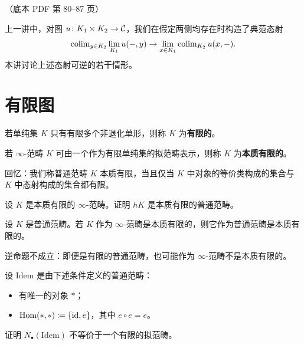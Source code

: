 \begin{center}\small\color{black!55}（底本 PDF 第 80–87 页）\end{center}

上一讲中，对图 $u\colon K_1\times K_2\to\mathcal{C}$，我们在假定两侧均存在时构造了典范态射
\[
\operatorname{colim}_{y\in K_2}\lim_{K_1}u(-,y)\to\lim_{x\in K_1}\operatorname{colim}_{K_2}u(x,-).
\]
本讲讨论上述态射可逆的若干情形。

\section{有限图}

\begin{definition}\label{L10-1.1}
若单纯集 $K$ 只有有限多个非退化单形，则称 $K$ 为\textbf{有限的}。

若 $\infty$-范畴 $K$ 可由一个作为有限单纯集的拟范畴表示，则称 $K$ 为\textbf{本质有限的}。
\end{definition}

\nitem\label{L10-1.2} 回忆：我们称普通范畴 $K$ 本质有限，当且仅当 $K$ 中对象的等价类构成的集合与 $K$ 中态射构成的集合都有限。

\begin{exercise}\label{L10-1.3}
设 $K$ 是本质有限的 $\infty$-范畴。证明 $hK$ 是本质有限的普通范畴。
\end{exercise}

\begin{exercise}\label{L10-1.4}
设 $K$ 是普通范畴。若 $K$ 作为 $\infty$-范畴是本质有限的，则它作为普通范畴是本质有限的。
\end{exercise}

\begin{warning}\label{L10-1.5}
逆命题不成立：即便是有限的普通范畴，也可能作为 $\infty$-范畴不是本质有限的。
\end{warning}

\begin{exercise}\label{L10-1.6}
设 $\mathrm{Idem}$ 是由下述条件定义的普通范畴：
\begin{itemize}[leftmargin=2.2em,itemsep=0.1em]
\item 有唯一的对象 $\ast$；
\item $\operatorname{Hom}(\ast,\ast)\coloneqq\{\operatorname{id},e\}$，其中 $e\circ e=e$。
\end{itemize}
证明 $N_{\bullet}(\mathrm{Idem})$ 不等价于一个有限的拟范畴。
\end{exercise}

